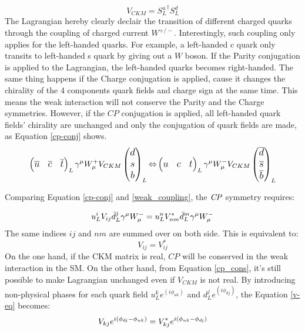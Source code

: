 \begin{equation}
V_{CKM} = 
{S^{u}_{L}}^{\dag}
S^{d}_{L}
\end{equation}
The Lagrangian hereby clearly declair the transition of different charged quarks through the coupling of charged current $W^{+/-}$. Interestingly, such coupling only applies for the left-handed quarks. For example, a left-handed c quark only transits to left-handed s quark by giving out a $W$ boson. If the Parity conjugation is applied to the Lagrangian, the left-handed quarks becomes right-handed. The same thing happens if the Charge conjugation is applied, cause it changes the chirality of the 4 components quark fields and charge sign at the same time. This means the weak interaction will not conserve the Parity and the Charge symmetries. However, if the $CP$ conjugation is applied, all left-handed quark fields' chirality are  unchanged and only the conjugation of quark fields are made, as Equation \ref{cp-conj} shows.
\begin{equation}\label{cp-conj}
\small
\large
\begin{pmatrix}
\overline{u}&\overline{c}&\overline{t}
\end{pmatrix}_L
\gamma^\mu W^{+}_{\mu}
V_{CKM}
\begin{pmatrix}
d\\s\\b\\
\end{pmatrix}_L
{\Leftrightarrow}
\begin{pmatrix}
{u}&{c}&{t}
\end{pmatrix}_L
\gamma^\mu W^{-}_{\mu}
{V_{CKM}}
\begin{pmatrix}
\overline d\\\overline s\\\overline b\\
\end{pmatrix}_L
\end{equation} 

Comparing  Equation \ref{cp-conj} and \ref{weak_coupling}, the $\it{CP}$ symmetry requires: 

\begin{equation}\label{cp_cons}
\large
{u_{L}^i}V_{ij} \bar{d}^{j}_L \gamma^\mu W^{-}_{\mu}
=
{{u}^{n}_LV^{*}_{nm}\bar{d}_{L}^m}  \gamma^\mu W^{-}_{\mu}
\end{equation}
The same indices $ij$ and $nm$ are summed over on both side. This is equivalent to: 
\begin{equation}\label{v-eq}
V_{ij} = V^{*}_{ij}
\end{equation}
On the one hand, if the CKM matrix is real, $CP$ will be conserved in the weak interaction in the SM. On the other hand, from Equation \ref{cp_cons}, it's still possible to make Lagrangian unchanged even if $V_{CKM}$ is not real. By introducing non-physical phases for each quark field $u^k_L e^{(i\phi_{uk})}$ and $d^j_L e^{(i\phi_{dj})}$, the Equation \ref{v-eq} becomes:
\begin{equation}
\Large
V_{kj} e^{i(\phi_{dj}-\phi_{uk})} = V^{*}_{kj}e^{i(\phi_{uk}-\phi_{dj})}
\end{equation}

